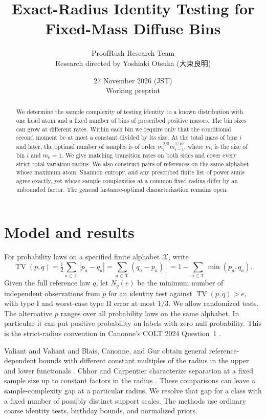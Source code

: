 \documentclass[11pt]{article}
\title{Exact-Radius Identity Testing for Fixed-Mass Diffuse Bins}
\author{ProofRush Research Team\\[2pt]\small Research directed by Yoshiaki Otsuka ({\namefont 大束良明})}
\date{27 November 2026 (JST)\\\small Working preprint}
\newcommand{\TV}{\operatorname{TV}}
\begin{document}
\maketitle

\begin{abstract}
We determine the sample complexity of testing identity to a known distribution with one head atom and a fixed number of bins of prescribed positive masses. The bin sizes can grow at different rates. Within each bin we require only that the conditional second moment be at most a constant divided by its size. At the total mass of bins \(i\) and later, the optimal number of samples is of order \(m_i^{2/5}m_{i-1}^{1/10}\), where \(m_i\) is the size of bin \(i\) and \(m_0=1\). We give matching transition rates on both sides and cover every strict total variation radius. We also construct pairs of references on the same alphabet whose maximum atom, Shannon entropy, and any prescribed finite list of power sums agree exactly, yet whose sample complexities at a common fixed radius differ by an unbounded factor. The general instance-optimal characterization remains open.
\end{abstract}

\section{Model and results}

For probability laws on a specified finite alphabet \(\mathcal X\), write
\[
 \TV(p,q)=\tfrac12\sum_{a\in\mathcal X}|p_a-q_a|
         =\sum_{a\in\mathcal X}(q_a-p_a)_+
         =1-\sum_{a\in\mathcal X}\min(p_a,q_a).
\]
Given the full reference law \(q\), let \(N_q(e)\) be the minimum number of independent observations from \(p\) for an identity test against \(\TV(p,q)>e\), with type I and worst-case type II error at most \(1/3\). We allow randomized tests. The alternative \(p\) ranges over all probability laws on the same alphabet. In particular it can put positive probability on labels with zero null probability. This is the strict-radius convention in Canonne's COLT 2024 Question~1 \cite{canonne}.

Valiant and Valiant and Blais, Canonne, and Gur obtain general reference-dependent bounds with different constant multiples of the radius in the upper and lower functionals \cite{vv,bcg,canonne}. Chhor and Carpentier characterize separation at a fixed sample size up to constant factors in the radius \cite{cc}. These comparisons can leave a sample-complexity gap at a particular radius. We resolve that gap for a class with a fixed number of possibly distinct support scales. The methods use ordinary coarse identity tests, birthday bounds, and normalized priors.
\end{document}
